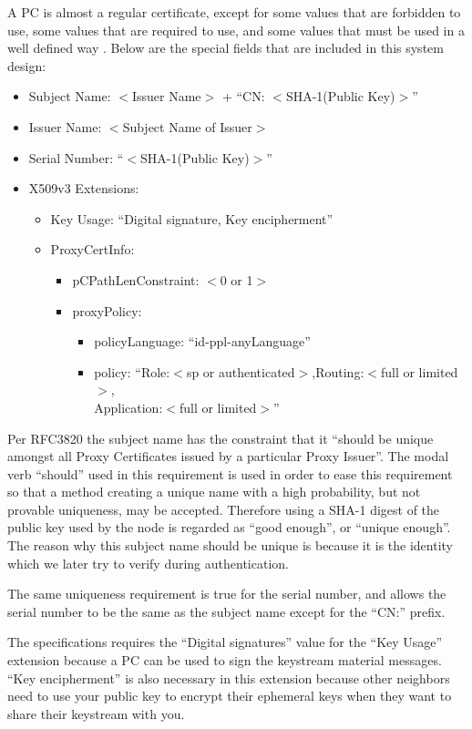 A \ac{PC} is almost a regular certificate, except for some values that are
forbidden to use, some values that are required to use, and some values that
must be used in a well defined way \cite{rfc3820}. Below are the special fields
that are included in this system design:
\begin{itemize}
  \item Subject Name: $<$Issuer Name$>$ + ``CN: $<$SHA-1(Public Key)$>$''
  \item Issuer Name: $<$Subject Name of Issuer$>$
  \item Serial Number: ``$<$SHA-1(Public Key)$>$''
  \item X509v3 Extensions:
  \begin{itemize}
    \item Key Usage: ``Digital signature, Key encipherment''
    \item ProxyCertInfo:
    \begin{itemize}
      \item pCPathLenConstraint: $<$0 or 1$>$
      \item proxyPolicy: 
      \begin{itemize}
        \item policyLanguage: ``id-ppl-anyLanguage''
        \item policy: ``Role:$<$sp or authenticated$>$,Routing:$<$full or
        limited$>$,\\Application:$<$full or limited$>$''
      \end{itemize}
    \end{itemize}
  \end{itemize}
\end{itemize}
Per RFC3820 \cite{rfc3820} the subject name has the constraint that it
``should be unique amongst all Proxy Certificates issued by a particular Proxy
Issuer''. The modal verb ``should'' used in this requirement is used in order
to ease this requirement so that a method creating a unique name with a high
probability, but not provable uniqueness, may be accepted. Therefore using a
SHA-1 digest of the public key used by the node is regarded as ``good enough'',
or ``unique enough''. The reason why this subject name should be unique is
because it is the identity which we later try to verify during authentication.

The same uniqueness requirement is true for the serial number, and allows the
serial number to be the same as the subject name except for the ``CN:'' prefix.

The specifications requires the ``Digital signatures'' value for the ``Key
Usage'' extension because a \ac{PC} can be used to sign the keystream material
messages. ``Key encipherment'' is also necessary in this extension because other
neighbors need to use your public key to encrypt their ephemeral keys when they
want to share their keystream with you.

